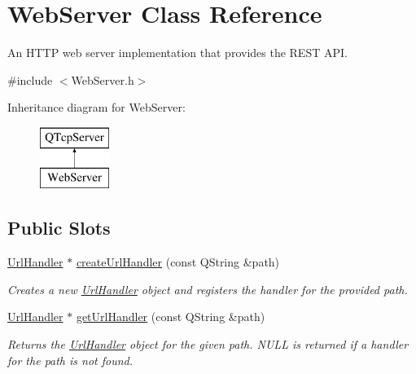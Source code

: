 \hypertarget{class_web_server}{}\section{Web\+Server Class Reference}
\label{class_web_server}


An H\+T\+TP web server implementation that provides the R\+E\+ST A\+PI.  




{\ttfamily \#include $<$Web\+Server.\+h$>$}

Inheritance diagram for Web\+Server\+:\begin{figure}[H]
\begin{center}
\leavevmode
\includegraphics[height=2.000000cm]{class_web_server}
\end{center}
\end{figure}
\subsection*{Public Slots}
\begin{DoxyCompactItemize}
\item 
\mbox{\label{class_web_server_a991ba62e7d4044e2f85fe1457aa5bad4}} 
\hyperlink{class_url_handler}{Url\+Handler} $\ast$ \hyperlink{class_web_server_a991ba62e7d4044e2f85fe1457aa5bad4}{create\+Url\+Handler} (const Q\+String \&path)
\begin{DoxyCompactList}\small\item\em Creates a new \hyperlink{class_url_handler}{Url\+Handler} object and registers the handler for the provided path. \end{DoxyCompactList}\item 
\mbox{\label{class_web_server_ac2d1d9d11eb504321fc4629b0e045ce3}} 
\hyperlink{class_url_handler}{Url\+Handler} $\ast$ \hyperlink{class_web_server_ac2d1d9d11eb504321fc4629b0e045ce3}{get\+Url\+Handler} (const Q\+String \&path)
\begin{DoxyCompactList}\small\item\em Returns the \hyperlink{class_url_handler}{Url\+Handler} object for the given path. N\+U\+LL is returned if a handler for the path is not found. \end{DoxyCompactList}\end{DoxyCompactItemize}

